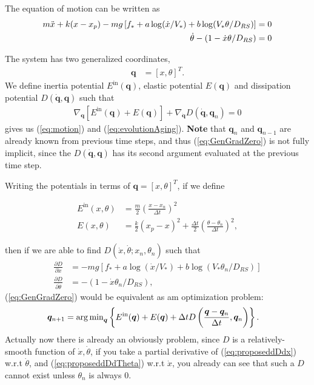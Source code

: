 The equation of motion can be written as 
\begin{align}
    m\Ddot{x} + k(x - x_p) - mg\left[f_* + a\log(\dot{x}/V_*) + b \log(V_* \theta / D_{RS})\right] &= 0 \label{eq:motion}\\
    \dot{\theta} - (1 - \dot{x} \theta / D_{RS}) &= 0 \label{eq:evolutionAging}
\end{align}

The system has two generalized coordinates, 
\begin{align}
    \boldsymbol{q} &= [x, \theta]^T \label{eq:GenCoords}. 
\end{align}
We define inertia potential $E^{\text{in}}(\boldsymbol{q})$, 
elastic potential
$E(\boldsymbol{q})$ and 
dissipation potential $D(\boldsymbol{\dot{q}}, \boldsymbol{q})$ such that
\begin{align}
    \nabla_{\boldsymbol{q}} \left[E^{\text{in}}(\boldsymbol{q}) + E(\boldsymbol{q})\right] + \nabla_{\dot{\boldsymbol{q}}}D(\boldsymbol{\dot{q}}, \boldsymbol{q}_n) = 0 \label{eq:GenGradZero}
\end{align}
gives us (\ref{eq:motion}) and (\ref{eq:evolutionAging}).
\textbf{Note} that $\boldsymbol{q}_n$ and $\boldsymbol{q}_{n-1}$ are already known from previous time steps, 
and thus (\ref{eq:GenGradZero}) is not fully implicit, 
since the $D(\boldsymbol{\dot{q}}, \boldsymbol{q})$ has its second argument evaluated at the previous time step. 

Writing the potentials in terms of $\boldsymbol{q} = [x, \theta]^T$, 
if we define 

\begin{align}
    E^{\text{in}}(x, \theta) &= \frac{m}{2} \left(\frac{x - x_n}{\Delta t}\right)^2 \label{eq:Ein}\\
    E(x, \theta) &= \frac{k}{2}(x_p - x)^2 + \frac{\Delta t}{2} \left(\frac{\theta - \theta_n}{\Delta t}\right)^2 \label{eq:Eelastic}, 
\end{align}

\noindent then if we are able to find $D(\dot{x}, \dot{\theta}; x_n, \theta_n)$ such that 
\begin{align}
    \frac{\partial D}{\partial \dot{x}} &= -mg\left[f_* + a\log(\dot{x}/V_*) + b \log(V_* \theta_n / D_{RS})\right] \label{eq:proposeddDdx} \\
    \frac{\partial D}{\partial \dot{\theta}} &= - (1 - \dot{x} \theta_n / D_{RS}) \label{eq:proposeddDdTheta}, 
\end{align}
(\ref{eq:GenGradZero}) would be equivalent as am optimization problem:
\begin{align}
    \boldsymbol{q}_{n+1} &= \operatorname{arg\,min}_{\boldsymbol{q}} \left\{E^{\text{in}}(\boldsymbol{q}) + E(\boldsymbol{q}) + \Delta t D\left(\frac{\boldsymbol{q}-\boldsymbol{q}_n}{\Delta t}, \boldsymbol{q}_n\right)\right\} \label{eq:OptProb}. 
\end{align}
Actually now there is already an obviously problem, 
since $D$ is a relatively-smooth function of $\dot{x}, \dot{\theta}$, 
if you take a partial derivative of (\ref{eq:proposeddDdx}) w.r.t $\dot{\theta}$, 
and (\ref{eq:proposeddDdTheta}) w.r.t $\dot{x}$, 
you already can see that such a $D$ cannot exist unless $\theta_n$ is always $0$. 

